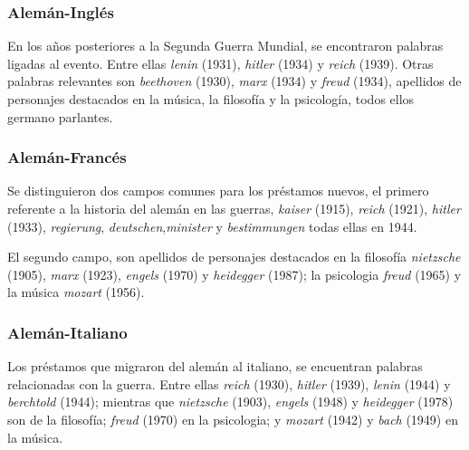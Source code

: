 

\subsubsection*{Alemán-Inglés}%

En los años posteriores a la Segunda Guerra Mundial, se encontraron palabras ligadas al evento. Entre ellas \textit{lenin} (1931), \textit{hitler} (1934) y \textit{reich} (1939).  Otras palabras relevantes son \textit{beethoven} (1930), \textit{marx} (1934) y \textit{freud} (1934), apellidos de personajes destacados en la música, la filosofía y la psicología, todos ellos germano parlantes.


\subsubsection*{Alemán-Francés}%


Se distinguieron dos campos comunes para los préstamos nuevos,  el primero referente a la historia del alemán en las guerras, \textit{kaiser} (1915), \textit{reich} (1921), \textit{hitler} (1933),  \textit{regierung}, \textit{deutschen},\textit{minister} y  \textit{bestimmungen} todas ellas en 1944. %

El segundo campo, son apellidos de  personajes destacados en la filosofía \textit{nietzsche} (1905),  \textit{marx} (1923), \textit{engels} (1970) y \textit{heidegger} (1987); la psicologia \textit{freud} (1965)  y  la música \textit{mozart} (1956). 



\subsubsection*{Alemán-Italiano}%

Los préstamos que migraron del alemán al italiano,  se encuentran palabras relacionadas con la guerra. Entre ellas \textit{reich} (1930),  \textit{hitler} (1939), \textit{lenin} (1944) y \textit{berchtold} (1944); mientras que 
\textit{nietzsche} (1903),  \textit{engels} (1948) y  \textit{heidegger} (1978) son de la filosofía; \textit{freud} (1970) en la psicologia; y \textit{mozart} (1942) y \textit{bach} (1949) en la música. 



